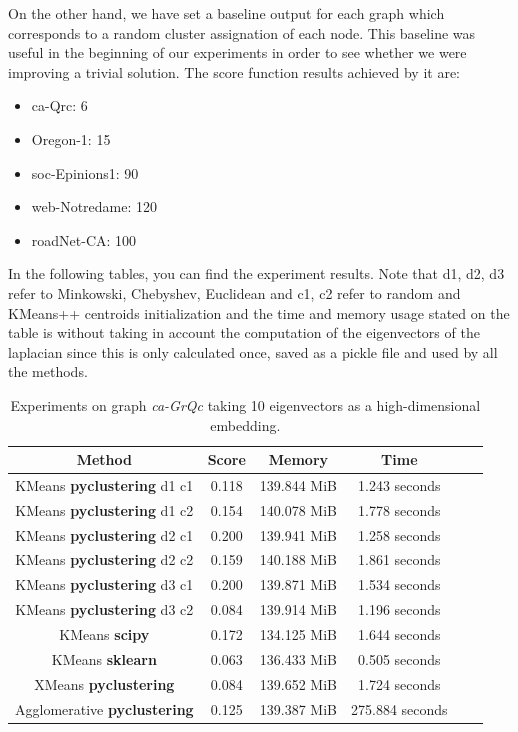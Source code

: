 \documentclass[11pt]{extarticle}
\begin{document}
On the other hand, we have set a baseline output for each graph which corresponds to a random cluster assignation of each node. This baseline was useful in the beginning of our experiments in order to see whether we were improving a trivial solution. The score function results achieved by it are:
\begin{itemize}
    \item ca-Qrc: 6
    \item Oregon-1: 15
    \item soc-Epinions1: 90
    \item web-Notredame: 120
    \item roadNet-CA: 100
\end{itemize}

In the following tables, you can find the experiment results. Note that d1, d2, d3 refer to Minkowski, Chebyshev, Euclidean and c1, c2 refer to random and KMeans++ centroids initialization and the time and memory usage stated on the table is without taking in account the computation of the eigenvectors of the laplacian since this is only calculated once, saved as a pickle file and used by all the methods.

\begin{table}[H]
\centering
\begin{tabular}{|c|c|c|c|c|c|}
\hline
\textbf{Method} & \textbf{Score} & \textbf{Memory} & \textbf{Time} \\ \hline
KMeans \textbf{pyclustering} d1 c1  & 0.118  & 139.844 MiB & 1.243 seconds\\ \hline
KMeans \textbf{pyclustering} d1 c2 & 0.154 & 140.078 MiB & 1.778 seconds \\ \hline
KMeans \textbf{pyclustering} d2 c1 & 0.200 & 139.941 MiB & 1.258 seconds \\ \hline 
KMeans \textbf{pyclustering} d2 c2 & 0.159 &  140.188 MiB & 1.861 seconds\\ \hline
KMeans \textbf{pyclustering} d3 c1 & 0.200 & 139.871 MiB  &  1.534 seconds\\ \hline
KMeans \textbf{pyclustering} d3 c2 & 0.084 & 139.914 MiB  & 1.196 seconds \\ \hline
KMeans \textbf{scipy} & 0.172 & 134.125 MiB & 1.644 seconds\\ \hline
KMeans \textbf{sklearn} & 0.063 & 136.433 MiB & 0.505 seconds\\ \hline 
XMeans \textbf{pyclustering} & 0.084 &  139.652 MiB & 1.724 seconds\\ \hline
Agglomerative \textbf{pyclustering} & 0.125  & 139.387 MiB & 275.884 seconds\\ \hline
\end{tabular}
\caption{Experiments on graph \textit{ca-GrQc} taking 10 eigenvectors as a high-dimensional embedding.}
\label{caQrc}
\end{table}
\end{document}
